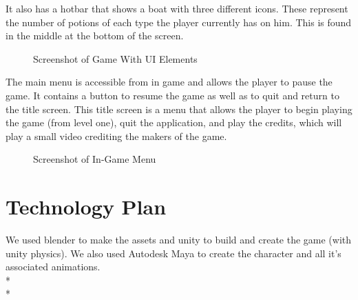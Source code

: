 \documentclass{article}
\begin{document}
It also has a hotbar that shows a boat with three different icons. These represent the number of potions of each type the player currently has on him. This is found in the middle at the bottom of the screen.

 \begin{figure}[!htb]
  \caption {Screenshot of Game With UI Elements}
  \end{figure}

The main menu is accessible from in game and allows the player to pause the game. It contains a button to resume the game as well as to quit and return to the title screen. This title screen is a menu that allows the player to begin playing the game (from level one), quit the application, and play the credits, which will play a small video crediting the makers of the game.

\begin{figure}[!htb]
  \caption {Screenshot of In-Game Menu}
  \end{figure}

\section{Technology Plan}
We used blender to make the assets and unity to build and create the game (with unity physics). We also used Autodesk Maya to create the character and all it's associated animations.\\*\\*
\end{document}
